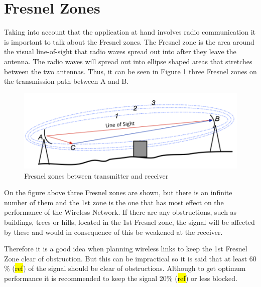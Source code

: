 \section{Fresnel Zones}\label{sec:fresnel}
Taking into account that the application at hand involves radio communication it is important to talk about the Fresnel zones. The Fresnel zone is the area around the visual line-of-sight that radio waves spread out into after they leave the antenna. The radio waves will spread out into ellipse shaped areas that stretches between the two antennas. Thus, it can be seen in Figure \ref{fig:fresnel_zones} three Fresnel zones on the transmission path between A and B. 

\begin{figure}[H]
	\centering
	\includegraphics[scale=0.65]{figures/fresnel_zones.png}
	\caption{Fresnel zones between transmitter and receiver}
	\label{fig:fresnel_zones}
\end{figure}

On the figure above three Fresnel zones are shown, but there is an infinite number of them and the 1st zone is the one that has most effect on the performance of the Wireless Network. If there are any obstructions, such as buildings, trees or hills, located in the 1st Fresnel zone, the signal will be affected by these and would in consequence of this be weakened at the receiver.

Therefore it is a good idea when planning wireless links to keep the 1st Fresnel Zone clear of obstruction. But this can be impractical so it is said that at least 60 $\%$ (\hl{ref}) of the signal should be clear of obstructions. Although to get optimum performance it is recommended to keep the signal 20$\%$ (\hl{ref}) or less blocked. \\
%
%
%
%
